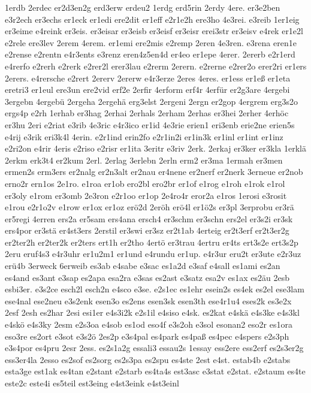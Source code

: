 {1erdb
2erdec
er2d3en2g
erd3erw
erdeu2
1erdg
erd5rin
2erdy
4ere.
er3e2ben
e3r2ech
er3echs
er1eck
er1edi
ere2dit
er1eff
e2r1e2h
ere3ho
4e3rei.
e3reib
1er1eig
er3eime
e4reink
er3eis.
er3eisar
er3eisb
er3eisf
er3eisr
erei3str
er3eisv
e4rek
er1e2l
e2rele
ere3lev
2erem
4erem.
er1emi
ere2mis
e2remp
2eren
4e3ren.
e3rena
eren1e
e2rense
e2rentn
e4r3ents
e3renz
eren4z5en4d
er4eo
er1epe
4erer.
2ererb
e2r1erd
e4rerfo
e2rerh
e2rerk
e2rer2l
erer3lau
e2rerm
2erern.
e2rerne
e2rer2o
erer2ri
er1ers
2erers.
e4rersche
e2rert
2ererv
2ererw
e4r3erze
2eres
4eres.
er1ess
er1eß
er1eta
eretri3
er1eul
ere3un
ere2vid
erf2e
2erfir
4erform
erf4r
4erfür
er2g3are
4ergebi
3ergebn
4ergebü
2ergeha
2ergehä
erg3elst
2ergeni
2ergn
er2gop
4ergrem
erg3s2o
ergs4p
e2rh
1erhab
er3hag
2erhai
2erhals
2erham
2erhas
er3hei
2erher
4erhöc
er3hu
2eri
e2riat
e3rib
4e3ric
e4r3ico
er1id
4e3rie
erien1
eri3enb
erie2ne
erien5s
e4rij
e3rik
eri3k4l
4erin.
e2r1ind
erin2fo
e2r1in2i
er1in3k
er1inl
er1int
er1inz
e2ri2on
e4rir
4eris
e2riso
e2risr
er1ita
3eritr
e3riv
2erk.
2erkaj
er3ker
er3kla
1erklä
2erkm
erk3t4
er2kum
2erl.
2erlag
3erlebn
2erln
erm2
er3ma
1ermah
er3men
ermen2s
erm3ers
er2nalg
er2n3alt
er2nau
er4nene
er2nerf
er2nerk
3erneue
er2nob
erno2r
ern1os
2e1ro.
e1roa
er1ob
ero2bl
ero2br
er1of
e1rog
e1roh
e1rok
e1rol
er3oly
e1rom
er3omb
2e3ron
e2r1oo
er1op
2e4ro4r
eror2a
e1ros
1erosi
e3rosit
e1rou
e2r1o2v
e1row
er1ox
er1oz
erö2d
2eröh
erö4l
er1ö2s
er3pl
3erprobu
er3rä
er5regi
4erren
ers2a
er5sam
ers4ana
ersch4
er3schm
er3schn
ers2el
er3s2i
er3sk
ers4por
er3stä
er4st3ers
2erstil
er3swi
er3sz
er2t1ab
4erteig
er2t3erf
er2t3er2g
er2ter2h
er2ter2k
er2ters
ert1h
er2tho
4ertö
er3trau
4ertru
er4ts
ert3s2e
ert3s2p
2eru
eruf4s3
e4r3uhr
er1u2m1
er1und
e4rundu
er1up.
e4r3ur
eru2t
er3ute
e2r3uz
erü4b
3erweck
6erweib
es3ab
e4sabe
e3sac
es1a2d
e3saf
e4sall
es1ami
es2an
es4and
es3ant
e3sap
es2apa
esa2ra
e3sas
es2ast
e3satz
esa2v
es1ax
es2äu
2esb
esbi3er.
e3s2ce
esch2l
esch2n
e4sco
e3se.
e2s1ec
es1ehr
esein2s
es4ek
es2el
ese3lam
ese4nal
ese2neu
e3s2enk
esen3o
es2ens
esen3sk
esen3th
ese4r1u4
eses2k
es3e2x
2esf
2esh
es2har
2esi
esi1er
e4s3i2k
e2s1il
e4siso
e4sk.
es2kat
e4skä
e4s3ke
e4s3kl
e4skö
e4s3ky
2esm
e2s3oa
e4sob
es1od
eso4f
e3s2oh
e3sol
esonan2
eso2r
es1ora
eso3re
es2ort
e3sot
e3s2ö
2es2p
e3s4pal
es4park
es4paß
es4pec
e4spers
e2s3ph
e3s4por
es4pru
2esr
2ess.
es2s1a2g
essali3
essau2s
1essay
ess2ere
ess2erf
es2s3er2g
ess3er4la
2esso
es2sof
es2sorg
es2s3pa
es2spu
es4ste
2est
e4st.
estab4b
e2stabs
esta3ge
est1ak
es4tan
e2stant
e2starb
es4ta4s
est3asc
e3stat
e2stat.
e2staum
es4te
este2c
este4i
es5teil
est3eing
e4st3eink
e4st3einl
}
